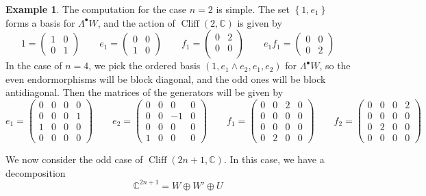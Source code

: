 \documentclass[psamsfonts]{amsart}
\theoremstyle{definition}
\newtheorem{exmp}[thm]{Example}
\theoremstyle{remark}
\newcommand{\C}{\mathbb{C}}
\newcommand{\set}[1]{\left\lbrace #1 \right\rbrace}
\DeclareMathOperator{\Cliff}{Cliff}
\begin{document}
\begin{exmp}
The computation for the case $n = 2$ is simple. The set $\set{1, e_1}$ forms a basis for $\Lambda^\bullet W$, and the action of $\Cliff(2,\C)$ is given by
\[
1 = \begin{pmatrix}
1 & 0 \\
0 & 1
\end{pmatrix} \qquad e_1 = \begin{pmatrix}
0 & 0 \\
1 & 0
\end{pmatrix} \qquad f_1 = \begin{pmatrix}
0 & 2 \\
0 & 0 \\
\end{pmatrix} \qquad e_1f_1 = \begin{pmatrix}
0 & 0 \\
0 & 2
\end{pmatrix}
\]
In the case of $n=4$, we pick the ordered basis $(1, e_1 \wedge e_2, e_1, e_2)$ for $\Lambda^\bullet W$, so the even endormorphisms will be block diagonal, and the odd ones will be block antidiagonal. Then the matrices of the generators will be given by
\[
e_1 = \begin{pmatrix}
0 & 0 & 0 & 0 \\
0 & 0 & 0 & 1 \\
1 & 0 & 0 & 0 \\
0 & 0 & 0 & 0
\end{pmatrix} \qquad e_2 = \begin{pmatrix}
0 & 0 & 0 & 0 \\
0 & 0 & -1 & 0 \\
0 & 0 & 0 & 0 \\
1 & 0 & 0 & 0 
\end{pmatrix} \qquad f_1 = \begin{pmatrix}
0 & 0 & 2 & 0 \\
0 & 0 & 0 & 0 \\
0 & 0 & 0 & 0 \\
0 & 2 & 0 & 0
\end{pmatrix} \qquad f_2 = \begin{pmatrix}
0 & 0 & 0 & 2 \\
0 & 0 & 0 & 0 \\
0 & 2 & 0 & 0 \\
0 & 0 & 0 & 0
\end{pmatrix}
\]
\end{exmp}
%
We now consider the odd case of $\Cliff(2n + 1, \C)$. In this case, we have a decomposition 
\[
\C^{2n+1} = W \oplus W' \oplus U
\]
\end{document}
